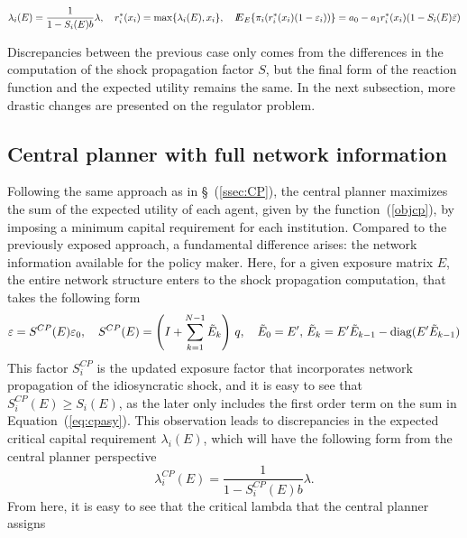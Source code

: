 \begin{equation}\label{eq:privsol}
\lambda_i(E)= \frac{1}{1-S_i(E)b}\lambda,\quad r_i^*(x_i) = \max\{\lambda_i(E),x_i\},\quad \Ex_E\{\pi_i(r_i^*(x_i)(1-\epsilon_i))\}=a_0-a_1r_i^*(x_i)(1-S_i(E)\bar\epsilon)
\end{equation}

Discrepancies between the previous case only comes from the differences in the computation of the shock propagation factor \(S\), but the final form of the reaction function and the expected utility remains the same.  In the next subsection, more drastic changes are presented on the regulator problem.

\subsection{Central planner with full network information}
Following the same approach as in \S~(\ref{ssec:CP}), the central planner maximizes the sum of the expected utility of each agent, given by the function~(\ref{objcp}), by imposing a minimum capital requirement for each institution. Compared to the previously exposed approach, a fundamental difference arises: the network information available for the policy maker.  Here, for a given exposure matrix \(E\), the entire network structure enters to the shock propagation computation, that takes the following form
\begin{equation}\label{eq:cpasy}
\epsilon = S^{CP}(E)\epsilon_0,\quad S^{CP}(E)=\left(I+\sum_{k=1}^{N-1}\tilde{E}_k\right)\,q,\quad \tilde{E}_0=E',\,\tilde{E}_k=E'\tilde{E}_{k-1}-{\rm diag}(E'\tilde{E}_{k-1})
\end{equation}
This factor $S^{CP}_i$ is the updated exposure factor that incorporates network propagation of the idiosyncratic shock, and it is easy to see that $S^{CP}_i(E)\geq S_i(E)$, as the later only includes the first order term on the sum in Equation~(\ref{eq:cpasy}).  This observation leads to discrepancies in the expected critical capital requirement $\lambda_i(E)$, which will have the following form from the central planner perspective
\[\lambda_i^{CP}(E)= \frac{1}{1-S_i^{CP}(E)b}\lambda.\]
From here, it is easy to see that the critical lambda that the central planner assigns 

